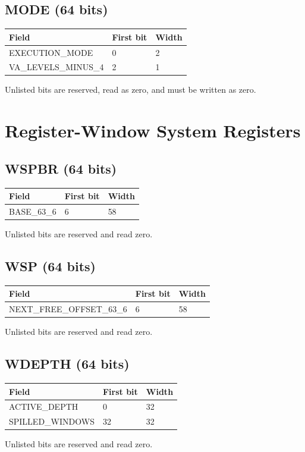 \documentclass[10pt]{article}
\begin{document}
\subsection{MODE (64 bits)}
\begin{longtable}{@{}L{4.5cm}L{2cm}L{2cm}@{}}
\toprule Field & First bit & Width \\ \midrule
EXECUTION\_\allowbreak{}MODE & 0 & 2 \\
VA\_\allowbreak{}LEVELS\_\allowbreak{}MINUS\_\allowbreak{}4 & 2 & 1 \\
\bottomrule\end{longtable}
Unlisted bits are reserved, read as zero, and must be written as zero.
\section{Register-Window System Registers}
\subsection{WSPBR (64 bits)}
\begin{longtable}{@{}L{4.5cm}L{2cm}L{2cm}@{}}
\toprule Field & First bit & Width \\ \midrule
BASE\_\allowbreak{}63\_\allowbreak{}6 & 6 & 58 \\
\bottomrule\end{longtable}
Unlisted bits are reserved and read zero.
\subsection{WSP (64 bits)}
\begin{longtable}{@{}L{4.5cm}L{2cm}L{2cm}@{}}
\toprule Field & First bit & Width \\ \midrule
NEXT\_\allowbreak{}FREE\_\allowbreak{}OFFSET\_\allowbreak{}63\_\allowbreak{}6 & 6 & 58 \\
\bottomrule\end{longtable}
Unlisted bits are reserved and read zero.
\subsection{WDEPTH (64 bits)}
\begin{longtable}{@{}L{4.5cm}L{2cm}L{2cm}@{}}
\toprule Field & First bit & Width \\ \midrule
ACTIVE\_\allowbreak{}DEPTH & 0 & 32 \\
SPILLED\_\allowbreak{}WINDOWS & 32 & 32 \\
\bottomrule\end{longtable}
Unlisted bits are reserved and read zero.
\end{document}
